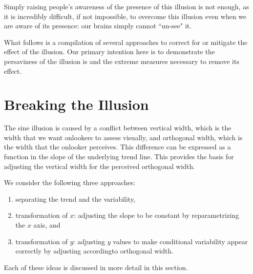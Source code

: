 \documentclass[11pt]{isuthesis}\usepackage[]{graphicx}\usepackage[]{color}
\begin{document}
Simply raising people's awareness of the presence of this illusion is not enough,
as it is incredibly difficult, if not impossible, to overcome this illusion even when we are aware of its presence: our brains simply cannot ``un-see" it. 

What follows is a compilation of several approaches to correct for or mitigate the effect of the illusion. Our primary intention here is to demonstrate the persaviness of the illusion is and the extreme measures necessary to remove its effect. 

\section{Breaking the Illusion}
The sine  illusion is caused by a conflict between vertical width, which is the width that we want onlookers to assess visually, and orthogonal width, which is the width that the onlooker perceives. This difference can be expressed as a function in the slope of the underlying trend line. This provides the basis for adjusting the vertical width for the perceived orthogonal width. 

We consider the following three approaches:  
\begin{enumerate}
\item separating the trend and the variability, 
\item transformation of $x$: adjusting the slope to be constant by reparametrizing the $x$ axis, and
\item transformation of $y$: adjusting $y$ values to make conditional variability  appear correctly by adjusting accordingto orthogonal width. 
\end{enumerate}
Each of these ideas is discussed in more detail in this section.
\end{document}
